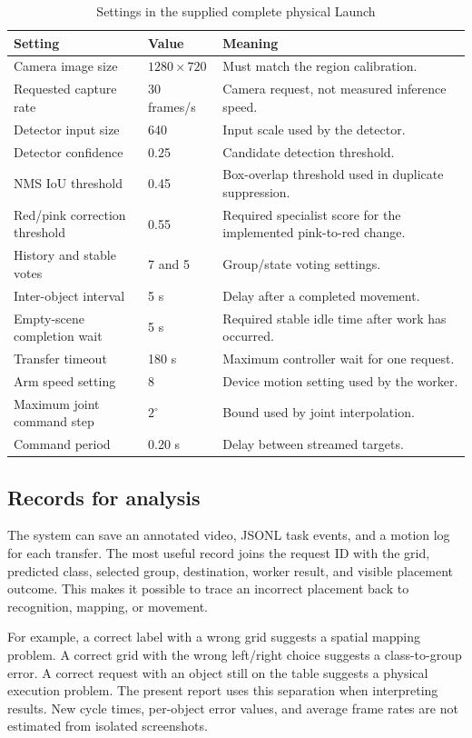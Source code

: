 \begin{table}[H]\tabstart
\caption{Settings in the supplied complete physical Launch}\label{tab:settings}
\begin{tabularx}{\textwidth}{@{}L{4.55cm}L{2.4cm}Y@{}}
\toprule Setting & Value & Meaning\\\midrule
Camera image size & $1280\times720$ & Must match the region calibration.\\
Requested capture rate & 30 frames/s & Camera request, not measured inference speed.\\
Detector input size & 640 & Input scale used by the detector.\\
Detector confidence & 0.25 & Candidate detection threshold.\\
NMS IoU threshold & 0.45 & Box-overlap threshold used in duplicate suppression.\\
Red/pink correction threshold & 0.55 & Required specialist score for the implemented pink-to-red change.\\
History and stable votes & 7 and 5 & Group/state voting settings.\\
Inter-object interval & 5 s & Delay after a completed movement.\\
Empty-scene completion wait & 5 s & Required stable idle time after work has occurred.\\
Transfer timeout & 180 s & Maximum controller wait for one request.\\
Arm speed setting & 8 & Device motion setting used by the worker.\\
Maximum joint command step & $2^\circ$ & Bound used by joint interpolation.\\
Command period & 0.20 s & Delay between streamed targets.\\
\bottomrule
\end{tabularx}
\end{table}

\subsection{Records for analysis}
The system can save an annotated video, JSONL task events, and a motion log for each transfer. The most useful record joins the request ID with the grid, predicted class, selected group, destination, worker result, and visible placement outcome. This makes it possible to trace an incorrect placement back to recognition, mapping, or movement.

For example, a correct label with a wrong grid suggests a spatial mapping problem. A correct grid with the wrong left/right choice suggests a class-to-group error. A correct request with an object still on the table suggests a physical execution problem. The present report uses this separation when interpreting results. New cycle times, per-object error values, and average frame rates are not estimated from isolated screenshots.
